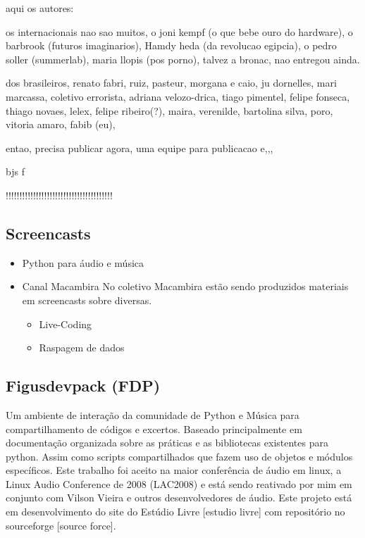 \begin{itemize}
aqui os autores:

os internacionais nao sao muitos, o joni kempf (o que bebe ouro do hardware), o barbrook (futuros imaginarios),
Hamdy heda (da revolucao egipcia), o pedro soller (summerlab), maria llopis (pos porno),  talvez a bronac, nao entregou ainda.

dos brasileiros, renato fabri, ruiz, pasteur, morgana e caio, ju dornelles, mari marcassa, coletivo errorista, adriana velozo-drica, tiago pimentel, felipe fonseca, thiago novaes, lelex, felipe ribeiro(?), maira, verenilde,  bartolina silva, poro, vitoria amaro, fabib (eu),

entao, precisa publicar agora,
uma equipe para publicacao e,,, 

bjs
f

!!!!!!!!!!!!!!!!!!!!!!!!!!!!!!!!!!!!!!!

\end{itemize}

\subsection{Screencasts}

\begin{itemize}
    \item Python para áudio e música

    \item Canal Macambira
No coletivo Macambira estão sendo produzidos materiais em screencasts sobre
diversas.
    \begin{itemize}
	\item Live-Coding
	\item Raspagem de dados
    \end{itemize}
\end{itemize}



\subsection{Figusdevpack (FDP)}

Um ambiente de interação da comunidade de Python e Música 
para compartilhamento de códigos e excertos. Baseado principalmente
em documentação organizada sobre as práticas e as bibliotecas
existentes para python. Assim como scripts compartilhados que
fazem uso de objetos e módulos específicos. Este trabalho foi aceito na
maior conferência de áudio em linux, a Linux Audio Conference de 2008
(LAC2008) e está sendo reativado por mim em conjunto com Vilson Vieira
e outros desenvolvedores de áudio. Este projeto está em desenvolvimento
do site do Estúdio Livre [estudio livre] com repositório no sourceforge [source force].

